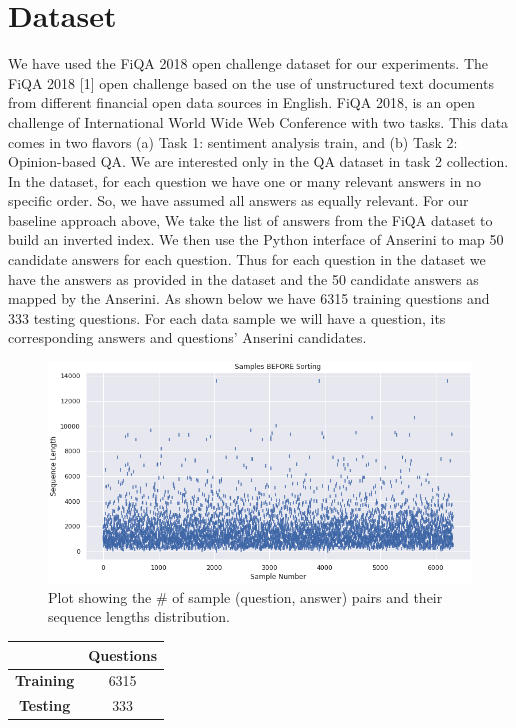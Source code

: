 \documentclass[11pt,a4paper]{article}
\begin{document}
\section{Dataset}
We have used the FiQA 2018 open challenge dataset for our experiments. The FiQA 2018 [1] open challenge based on the use of unstructured text documents from different financial open data sources in English.  FiQA 2018, is an open challenge of International World Wide Web Conference with two tasks. This data comes in two flavors (a) Task 1: sentiment analysis train, and (b) Task 2: Opinion-based QA. We are interested only in the QA dataset in task 2 collection. In the dataset, for each question we have one or many relevant answers in no specific order. So, we have assumed all answers as equally relevant. For our baseline approach above, We take the list of answers from the FiQA dataset to build an inverted index. We then use the Python interface of Anserini to map 50 candidate answers for each question. Thus for each question in the dataset we have the answers as provided in the dataset and the 50 candidate answers as mapped by the Anserini. As shown below we have 6315 training questions and 333 testing questions. For each data sample we will have a question, its corresponding answers and questions' Anserini candidates.

\begin{figure}
  \includegraphics[width=\linewidth]{doc_size_distribution.png}
  \caption{Plot showing the # of sample (question, answer) pairs and their sequence lengths distribution.}
  \label{fig:Sequence Length Distribution}
\end{figure}

\begin{center}
\begin{tabular}{||c c ||} 
 \hline
 \textbf{} & \textbf{Questions} \\ [0.5ex] 
 \hline\hline
 \textbf{Training} & 6315 \\ 
 \hline
 \textbf{Testing} & 333 \\
 \hline

 \hline
\end{tabular}
\end{center}
\end{document}
